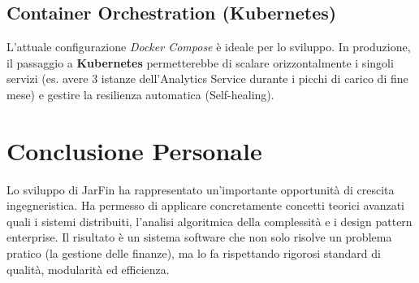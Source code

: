 \subsection{Container Orchestration (Kubernetes)}
L'attuale configurazione \textit{Docker Compose} è ideale per lo sviluppo. In produzione, il passaggio a \textbf{Kubernetes} permetterebbe di scalare orizzontalmente i singoli servizi (es. avere 3 istanze dell'Analytics Service durante i picchi di carico di fine mese) e gestire la resilienza automatica (Self-healing).

\section{Conclusione Personale}

Lo sviluppo di JarFin ha rappresentato un'importante opportunità di crescita ingegneristica. Ha permesso di applicare concretamente concetti teorici avanzati quali i sistemi distribuiti, l'analisi algoritmica della complessità e i design pattern enterprise.
Il risultato è un sistema software che non solo risolve un problema pratico (la gestione delle finanze), ma lo fa rispettando rigorosi standard di qualità, modularità ed efficienza.